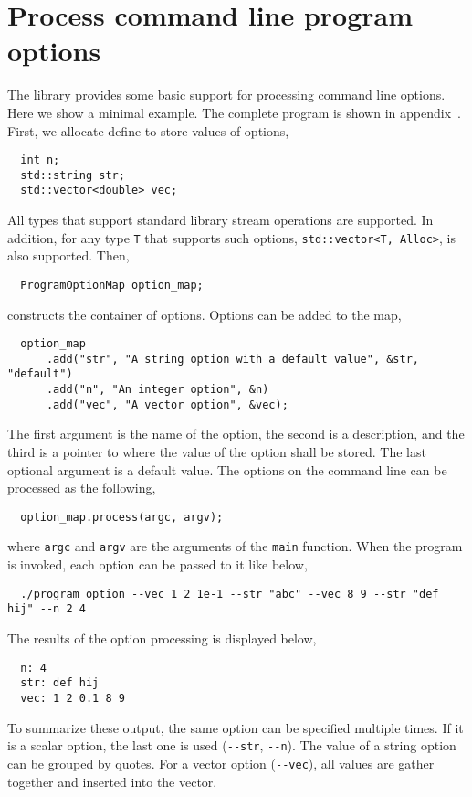 \section{Process command line program options}
\label{sec:Process command line program options}

The library provides some basic support for processing command line options.
Here we show a minimal example. The complete program is shown in
appendix~. First, we
allocate define to store values of options,
\begin{Verbatim}
  int n;
  std::string str;
  std::vector<double> vec;
\end{Verbatim}
All types that support standard library \io stream operations are supported. In
addition, for any type \verb|T| that supports such options,
\verb|std::vector<T, Alloc>|, is also supported. Then,
\begin{Verbatim}
  ProgramOptionMap option_map;
\end{Verbatim}
constructs the container of options. Options can be added to the map,
\begin{Verbatim}
  option_map
      .add("str", "A string option with a default value", &str, "default")
      .add("n", "An integer option", &n)
      .add("vec", "A vector option", &vec);
\end{Verbatim}
The first argument is the name of the option, the second is a description, and
the third is a pointer to where the value of the option shall be stored. The
last optional argument is a default value. The options on the command line can
be processed as the following,
\begin{Verbatim}
  option_map.process(argc, argv);
\end{Verbatim}
where \verb|argc| and \verb|argv| are the arguments of the \verb|main|
function. When the program is invoked, each option can be passed to it like
below,
\begin{Verbatim}
  ./program_option --vec 1 2 1e-1 --str "abc" --vec 8 9 --str "def hij" --n 2 4
\end{Verbatim}
The results of the option processing is displayed below,
\begin{Verbatim}
  n: 4
  str: def hij
  vec: 1 2 0.1 8 9
\end{Verbatim}
To summarize these output, the same option can be specified multiple times. If
it is a scalar option, the last one is used (\verb|--str|, \verb|--n|). The
value of a string option can be grouped by quotes. For a vector option
(\verb|--vec|), all values are gather together and inserted into the vector.

